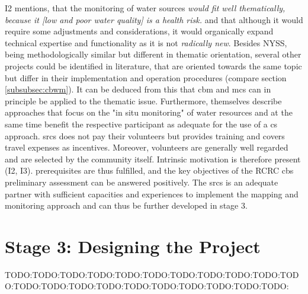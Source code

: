 I2 mentions, that the monitoring of water sources \textit{would fit well thematically, because it [low and poor water quality] is a health risk.} and that although it would require some adjustments and considerations, it would organically expand technical expertise and functionality as it is not \textit{radically new}. Besides NYSS, being methodologically similar but different in thematic orientation, several other projects could be identified in literature, that are oriented towards the same topic but differ in their implementation and operation procedures (compare section \ref*{subsubsec:cbwm}). It can be deduced from this that \acrshort{cbm} and \acrshort{mcs} can in principle be applied to the thematic issue. Furthermore, \autocite{fraislCitizenScienceEnvironmental2022} themselves describe approaches that focus on the "in situ monitoring" of water resources and at the same time benefit the respective participant as adequate for the use of a \acrlong{cs} approach. \acrshort{srcs} does not pay their volunteers but provides training and covers travel expenses as incentives. Moreover, volunteers are generally well regarded and are selected by the community itself. Intrinsic motivation is therefore present (I2, I3).
\autocite{fraislCitizenScienceEnvironmental2022} prerequisites are thus fulfilled, and the key objectives of the RCRC \acrshort{cbs} preliminary assessment can be answered positively. The \acrshort{srcs} is an adequate partner with sufficient capacities and experiences to implement the mapping and monitoring approach and can thus be further developed in stage 3. 


\section{Stage 3: Designing the Project}
TODO:TODO:TODO:TODO:TODO:TODO:TODO:TODO:TODO:TODO:TODO:TODO:TODO:TODO:TODO:TODO:TODO:TODO:TODO:TODO:TODO:



